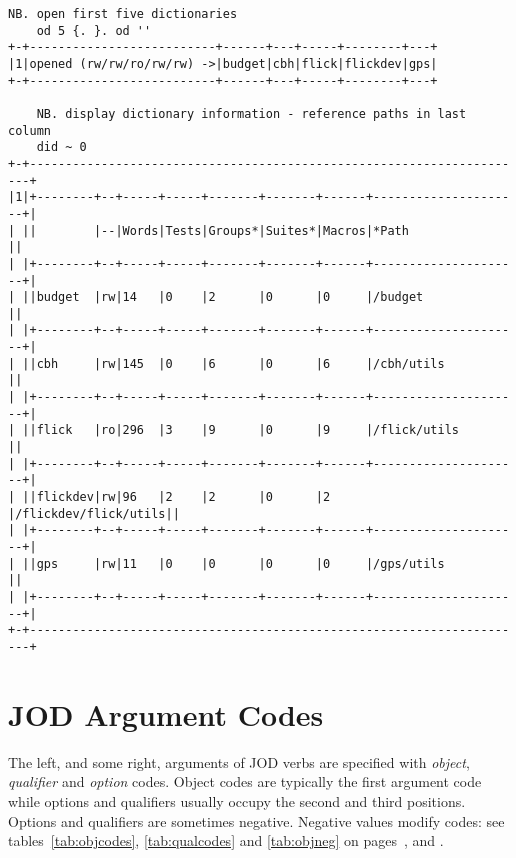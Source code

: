 \begin{lstlisting}[frame=single,framerule=0pt,basicstyle=\ttfamily\footnotesize]
    NB. open first five dictionaries 
    od 5 {. }. od ''
+-+--------------------------+------+---+-----+--------+---+
|1|opened (rw/rw/ro/rw/rw) ->|budget|cbh|flick|flickdev|gps|
+-+--------------------------+------+---+-----+--------+---+

    NB. display dictionary information - reference paths in last column
    did ~ 0
+-+----------------------------------------------------------------------+
|1|+--------+--+-----+-----+-------+-------+------+---------------------+|
| ||        |--|Words|Tests|Groups*|Suites*|Macros|*Path                ||
| |+--------+--+-----+-----+-------+-------+------+---------------------+|
| ||budget  |rw|14   |0    |2      |0      |0     |/budget              ||
| |+--------+--+-----+-----+-------+-------+------+---------------------+|
| ||cbh     |rw|145  |0    |6      |0      |6     |/cbh/utils           ||
| |+--------+--+-----+-----+-------+-------+------+---------------------+|
| ||flick   |ro|296  |3    |9      |0      |9     |/flick/utils         ||
| |+--------+--+-----+-----+-------+-------+------+---------------------+|
| ||flickdev|rw|96   |2    |2      |0      |2     |/flickdev/flick/utils||
| |+--------+--+-----+-----+-------+-------+------+---------------------+|
| ||gps     |rw|11   |0    |0      |0      |0     |/gps/utils           ||
| |+--------+--+-----+-----+-------+-------+------+---------------------+|
+-+----------------------------------------------------------------------+
\end{lstlisting}
   
   \newpage
   \section{JOD Argument Codes}

The left, and some right, arguments of JOD verbs are specified with \emph{object}, \emph{qualifier} and \emph{option} codes. Object codes are typically the first argument code while options and qualifiers usually occupy the second and third positions. Options and qualifiers are sometimes negative. Negative values modify codes: see tables~\ref{tab:objcodes}, \ref{tab:qualcodes} and
\ref{tab:objneg} on 
pages~\pageref{tab:objcodes}, \pageref{tab:qualcodes} and \pageref{tab:objneg}.

